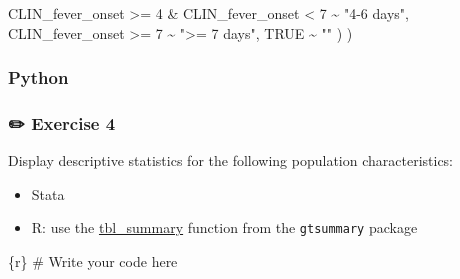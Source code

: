 \documentclass[
  letterpaper,
  DIV=11,
  numbers=noendperiod,
  oneside]{scrreprt}
\newenvironment{Shaded}{\begin{snugshade}}{\end{snugshade}}
\newcommand{\CommentTok}[1]{\textcolor[rgb]{0.37,0.37,0.37}{#1}}
\newcommand{\ConstantTok}[1]{\textcolor[rgb]{0.56,0.35,0.01}{#1}}
\newcommand{\DecValTok}[1]{\textcolor[rgb]{0.68,0.00,0.00}{#1}}
\newcommand{\InformationTok}[1]{\textcolor[rgb]{0.37,0.37,0.37}{#1}}
\newcommand{\NormalTok}[1]{\textcolor[rgb]{0.00,0.23,0.31}{#1}}
\newcommand{\SpecialCharTok}[1]{\textcolor[rgb]{0.37,0.37,0.37}{#1}}
\newcommand{\StringTok}[1]{\textcolor[rgb]{0.13,0.47,0.30}{#1}}
\providecommand{\tightlist}{%
  \setlength{\itemsep}{0pt}\setlength{\parskip}{0pt}}\usepackage{longtable,booktabs,array}
\begin{document}
\begin{Shaded}
\begin{Highlighting}[]
\NormalTok{      CLIN\_fever\_onset }\SpecialCharTok{\textgreater{}=} \DecValTok{4} \SpecialCharTok{\&}\NormalTok{ CLIN\_fever\_onset }\SpecialCharTok{\textless{}} \DecValTok{7} \SpecialCharTok{\textasciitilde{}} \StringTok{"4{-}6 days"}\NormalTok{,}
\NormalTok{      CLIN\_fever\_onset }\SpecialCharTok{\textgreater{}=} \DecValTok{7} \SpecialCharTok{\textasciitilde{}} \StringTok{"\textgreater{}= 7 days"}\NormalTok{,}
      \ConstantTok{TRUE} \SpecialCharTok{\textasciitilde{}} \StringTok{""}
\NormalTok{    )}
\NormalTok{  )}
\InformationTok{\textasciigrave{}\textasciigrave{}\textasciigrave{}}
\end{Highlighting}
\end{Shaded}

\hypertarget{python-4}{%
\subsubsection{Python}\label{python-4}}

\hypertarget{exercise-4-1}{%
\subsubsection{\texorpdfstring{{✏️} Exercise
4}{✏️ Exercise 4}}\label{exercise-4-1}}

Display descriptive statistics for the following population
characteristics:

\begin{tcolorbox}[enhanced jigsaw, colbacktitle=quarto-callout-tip-color!10!white, titlerule=0mm, breakable, opacityback=0, opacitybacktitle=0.6, left=2mm, coltitle=black, colback=white, title=\textcolor{quarto-callout-tip-color}{\faLightbulb}\hspace{0.5em}{Tip}, rightrule=.15mm, colframe=quarto-callout-tip-color-frame, toprule=.15mm, bottomtitle=1mm, toptitle=1mm, arc=.35mm, bottomrule=.15mm, leftrule=.75mm]

\begin{itemize}
\tightlist
\item
  Stata
\item
  R: use the
  \href{https://www.danieldsjoberg.com/gtsummary/reference/tbl_summary.html}{tbl\_summary}
  function from the \texttt{gtsummary} package
\end{itemize}

\end{tcolorbox}

\begin{Shaded}
\begin{Highlighting}[]
\InformationTok{\textasciigrave{}\textasciigrave{}\textasciigrave{}\{r\}}
\CommentTok{\# Write your code here}
\InformationTok{\textasciigrave{}\textasciigrave{}\textasciigrave{}}
\end{Highlighting}
\end{Shaded}
\end{document}
